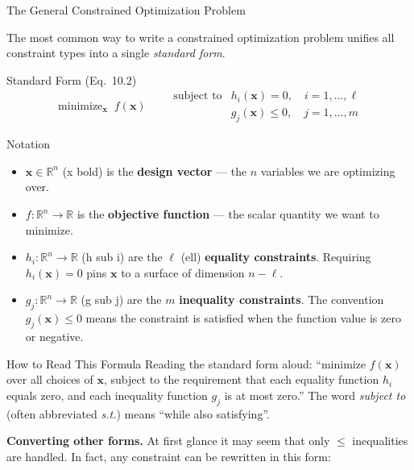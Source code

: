 \documentclass[aspectratio=169,10pt]{beamer}
\newcommand{\R}{\mathbb{R}}
\newcommand{\bx}{\mathbf{x}}
\DeclareMathOperator*{\minimize}{minimize}
\begin{document}
\begin{frame}[allowframebreaks]{The General Constrained Optimization Problem}

  The most common way to write a constrained optimization problem unifies all
  constraint types into a single \emph{standard form}.

  \begin{block}{Standard Form (Eq.~10.2)}
    \[
      \minimize_{\bx}\; f(\bx) \qquad
      \begin{array}{ll}
        \text{subject to} & h_i(\bx) = 0, \quad i = 1,\ldots,\ell \\
                          & g_j(\bx) \le 0, \quad j = 1,\ldots,m
      \end{array}
    \]
  \end{block}

  \begin{block}{Notation}
    \begin{itemize}
      \item $\bx \in \R^n$ (x bold) is the \textbf{design vector} --- the $n$
            variables we are optimizing over.
      \item $f : \R^n \to \R$ is the \textbf{objective function} --- the scalar
            quantity we want to minimize.
      \item $h_i : \R^n \to \R$ (h sub i) are the $\ell$ (ell)
            \textbf{equality constraints}.  Requiring $h_i(\bx)=0$ pins $\bx$
            to a surface of dimension $n-\ell$.
      \item $g_j : \R^n \to \R$ (g sub j) are the $m$
            \textbf{inequality constraints}.  The convention $g_j(\bx)\le 0$
            means the constraint is satisfied when the function value is zero or
            negative.
    \end{itemize}
  \end{block}

  \framebreak

  \begin{alertblock}{How to Read This Formula}
    Reading the standard form aloud: ``minimize $f(\bx)$ over all choices of
    $\bx$, subject to the requirement that each equality function $h_i$ equals
    zero, and each inequality function $g_j$ is at most zero.''  The word
    \emph{subject to} (often abbreviated \emph{s.t.}) means ``while also
    satisfying''.
  \end{alertblock}

  \medskip
  \textbf{Converting other forms.}  At first glance it may seem that only
  $\le$ inequalities are handled.  In fact, any constraint can be rewritten in
  this form:


\end{frame}
\end{document}
